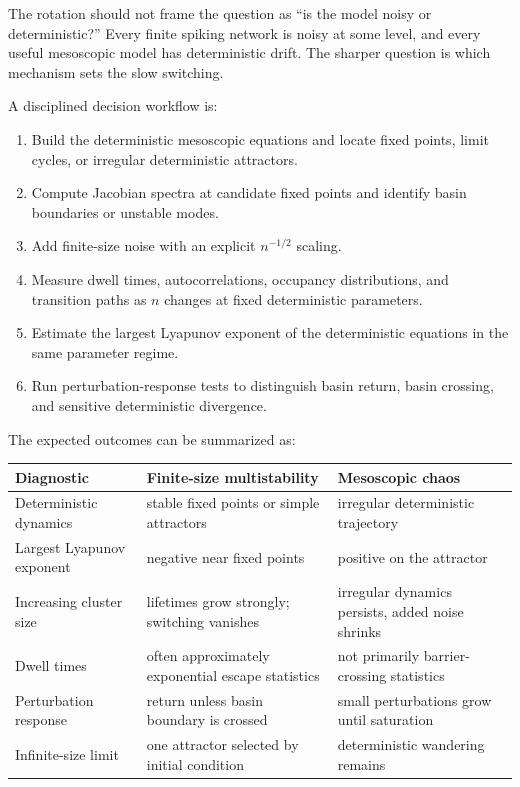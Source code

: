 The rotation should not frame the question as ``is the model noisy or deterministic?'' Every finite spiking network is noisy at some level, and every useful mesoscopic model has deterministic drift. The sharper question is which mechanism sets the slow switching.

A disciplined decision workflow is:
%
\begin{enumerate}[leftmargin=*]
  \item Build the deterministic mesoscopic equations and locate fixed points, limit cycles, or irregular deterministic attractors.
  \item Compute Jacobian spectra at candidate fixed points and identify basin boundaries or unstable modes.
  \item Add finite-size noise with an explicit $n^{-1/2}$ scaling.
  \item Measure dwell times, autocorrelations, occupancy distributions, and transition paths as $n$ changes at fixed deterministic parameters.
  \item Estimate the largest Lyapunov exponent of the deterministic equations in the same parameter regime.
  \item Run perturbation-response tests to distinguish basin return, basin crossing, and sensitive deterministic divergence.
\end{enumerate}

The expected outcomes can be summarized as:
%
\begin{center}
\renewcommand{\arraystretch}{1.35}
\begin{tabularx}{\textwidth}{@{}l X X@{}}
  \toprule
  \textbf{Diagnostic} & \textbf{Finite-size multistability} & \textbf{Mesoscopic chaos} \\
  \midrule
  Deterministic dynamics & stable fixed points or simple attractors & irregular deterministic trajectory \\
  Largest Lyapunov exponent & negative near fixed points & positive on the attractor \\
  Increasing cluster size & lifetimes grow strongly; switching vanishes & irregular dynamics persists, added noise shrinks \\
  Dwell times & often approximately exponential escape statistics & not primarily barrier-crossing statistics \\
  Perturbation response & return unless basin boundary is crossed & small perturbations grow until saturation \\
  Infinite-size limit & one attractor selected by initial condition & deterministic wandering remains \\
  \bottomrule
\end{tabularx}
\end{center}

